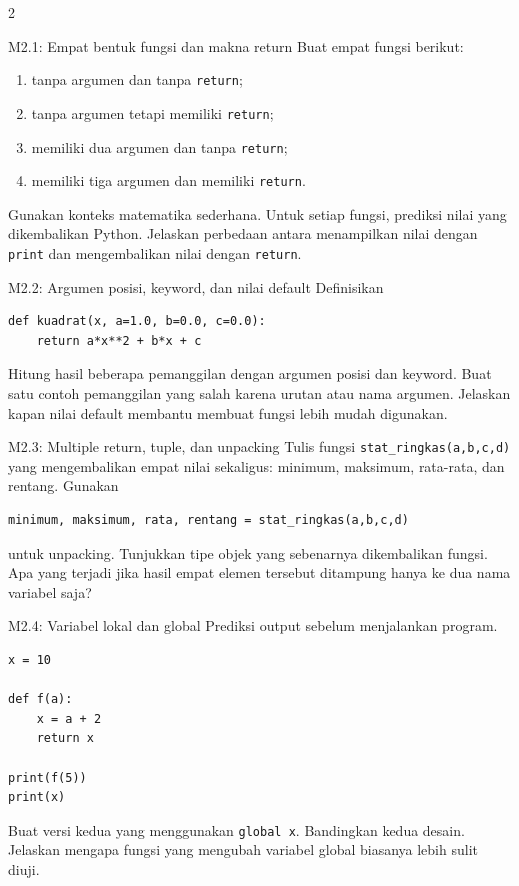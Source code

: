 \documentclass[9pt,a4paper]{article}
\begin{document}
\begin{multicols}{2}
\begin{qbox}[L1]{M2.1: Empat bentuk fungsi dan makna return}
Buat empat fungsi berikut:
\begin{enumerate}
\item tanpa argumen dan tanpa \texttt{return};
\item tanpa argumen tetapi memiliki \texttt{return};
\item memiliki dua argumen dan tanpa \texttt{return};
\item memiliki tiga argumen dan memiliki \texttt{return}.
\end{enumerate}
Gunakan konteks matematika sederhana. Untuk setiap fungsi, prediksi nilai yang dikembalikan Python. Jelaskan perbedaan antara menampilkan nilai dengan \texttt{print} dan mengembalikan nilai dengan \texttt{return}.
\end{qbox}

\begin{qbox}[L2]{M2.2: Argumen posisi, keyword, dan nilai default}
Definisikan
\begin{lstlisting}
def kuadrat(x, a=1.0, b=0.0, c=0.0):
    return a*x**2 + b*x + c
\end{lstlisting}
Hitung hasil beberapa pemanggilan dengan argumen posisi dan keyword. Buat satu contoh pemanggilan yang salah karena urutan atau nama argumen. Jelaskan kapan nilai default membantu membuat fungsi lebih mudah digunakan.
\end{qbox}

\begin{qbox}[L2]{M2.3: Multiple return, tuple, dan unpacking}
Tulis fungsi \texttt{stat\_ringkas(a,b,c,d)} yang mengembalikan empat nilai sekaligus: minimum, maksimum, rata-rata, dan rentang. Gunakan
\begin{lstlisting}
minimum, maksimum, rata, rentang = stat_ringkas(a,b,c,d)
\end{lstlisting}
untuk unpacking. Tunjukkan tipe objek yang sebenarnya dikembalikan fungsi. Apa yang terjadi jika hasil empat elemen tersebut ditampung hanya ke dua nama variabel saja?
\end{qbox}

\begin{qbox}[L2]{M2.4: Variabel lokal dan global}
Prediksi output sebelum menjalankan program.
\begin{lstlisting}
x = 10

def f(a):
    x = a + 2
    return x

print(f(5))
print(x)
\end{lstlisting}
Buat versi kedua yang menggunakan \texttt{global x}. Bandingkan kedua desain. Jelaskan mengapa fungsi yang mengubah variabel global biasanya lebih sulit diuji.
\end{qbox}


\end{multicols}
\end{document}
